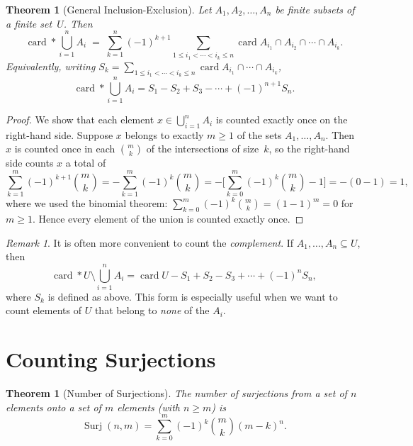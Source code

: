 \documentclass[12pt,a4paper,openany]{book}
\theoremstyle{definition}
\theoremstyle{plain}
\newtheorem{theorem}[definition]{Theorem}
\theoremstyle{remark}
\newtheorem{remark}[definition]{Remark}
\DeclareMathOperator{\card}{card}
\begin{document}
\begin{theorem}[General Inclusion-Exclusion]\label{thm:ie-general}
Let $A_1, A_2, \dots, A_n$ be finite subsets of a finite set~$U$.  Then
\[
  \card*{\bigcup_{i=1}^{n} A_i}
  \;=\;
  \sum_{k=1}^{n} (-1)^{k+1}
  \!\!\sum_{1 \le i_1 < \cdots < i_k \le n}
  \card{A_{i_1} \cap A_{i_2} \cap \cdots \cap A_{i_k}}.
\]
Equivalently, writing $S_k = \sum_{1\le i_1<\cdots<i_k\le n}
\card{A_{i_1}\cap\cdots\cap A_{i_k}}$,
\[
  \card*{\bigcup_{i=1}^n A_i}
  = S_1 - S_2 + S_3 - \cdots + (-1)^{n+1} S_n.
\]
\end{theorem}

\begin{proof}
We show that each element $x \in \bigcup_{i=1}^{n} A_i$ is counted
exactly once on the right-hand side.  Suppose $x$ belongs to exactly
$m \ge 1$ of the sets $A_1, \dots, A_n$.  Then $x$ is counted once in
each $\binom{m}{k}$ of the intersections of size~$k$, so the
right-hand side counts $x$ a total of
\[
  \sum_{k=1}^{m} (-1)^{k+1}\binom{m}{k}
  = -\sum_{k=1}^{m}(-1)^{k}\binom{m}{k}
  = -\!\Biggl[\sum_{k=0}^{m}(-1)^k \binom{m}{k} - 1\Biggr]
  = -(0 - 1) = 1,
\]
where we used the binomial theorem: $\sum_{k=0}^{m}(-1)^k\binom{m}{k}
= (1-1)^m = 0$ for $m \ge 1$.  Hence every element of the union is
counted exactly once.
\end{proof}

\begin{remark}\label{rem:ie-complement}
It is often more convenient to count the \emph{complement}.  If $A_1,
\dots, A_n \subseteq U$, then
\[
  \card*{U \setminus \bigcup_{i=1}^n A_i}
  = \card{U} - S_1 + S_2 - S_3 + \cdots + (-1)^n S_n,
\]
where $S_k$ is defined as above.  This form is especially useful when
we want to count elements of $U$ that belong to \emph{none} of the
$A_i$.
\end{remark}



\section{Counting Surjections}\label{sec:surjections}

\begin{theorem}[Number of Surjections]\label{thm:surjections}
The number of surjections from a set of $n$ elements onto a set of
$m$ elements (with $n \ge m$) is
\[
  \operatorname{Surj}(n,m)
  = \sum_{k=0}^{m} (-1)^k \binom{m}{k}(m-k)^n.
\]
\end{theorem}
\end{document}
